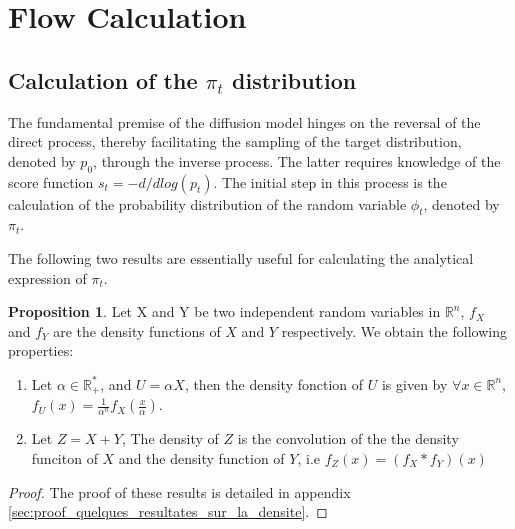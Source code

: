 \documentclass[a4paper,10pt]{article}
\theoremstyle{definition} %
\theoremstyle{definition} %
\newtheorem{proposition}[definition]{Proposition}
\theoremstyle{definition} %
\theoremstyle{definition} %
\newcommand{\R}{\mathbb{R}}
\newcommand{\0}{\boldsymbol{0}}
\begin{document}
\section{Flow Calculation} \label{sec:calcul_numerique}
\subsection{Calculation of the $\pi_t$ distribution}

The fundamental premise of the diffusion model hinges on the reversal of the direct process, thereby facilitating the sampling of the target distribution, denoted by $p_0$, through the inverse process. The latter requires knowledge of the score function $s_t = -d/dlog(p_t)$. The initial step in this process is the calculation of the probability distribution of the random variable $\phi_t$, denoted by $\pi_t$.

The following two results are essentially useful for calculating the analytical expression of $\pi_t$.
\begin{proposition}\label{prop:quelques_resultats_sur_la_densite}
    Let X and Y be two independent random variables in $\R^n$, $f_X$ and $f_Y$ are the density functions of $X$ and $Y$ respectively. We obtain the following properties:
    \vspace{-10pt}
\begin{enumerate}[label=(\roman*)]
    \item Let $\alpha \in \R_+^*$, and $U = \alpha X$, then the density fonction of $U$ is given by $\forall x\in \R^n$, $f_U(x) = \frac{1}{\alpha^n} f_X(\frac{x}{\alpha})$.
    \item Let $Z = X+Y$, The density of $Z$ is the convolution of the the density funciton of $X$ and the density function of $Y$, i.e $f_Z(x) = (f_X * f_Y)(x)$
\end{enumerate}
\end{proposition}

\begin{proof}
The proof of these results is detailed in appendix \cref{sec:proof_quelques_resultates_sur_la_densite}.
\end{proof}
\end{document}

